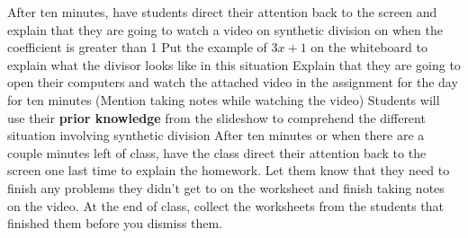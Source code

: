 \begin{outline}
    \1 After ten minutes, have students direct their attention back to the screen and explain that they are going to watch a video on synthetic division on when the coefficient is greater than 1
        \2 Put the example of $3x + 1$ on the whiteboard to explain what the divisor looks like in this situation
    \1 Explain that they are going to open their computers and watch the attached video in the assignment for the day for ten minutes (Mention taking notes while watching the video)
        \2 Students will use their \textbf{prior knowledge} from the slideshow to comprehend the different situation involving synthetic division
    \newpage
    \1 After ten minutes or when there are a couple minutes left of class, have the class direct their attention back to the screen one last time to explain the homework. Let them know that they need to finish any problems they didn't get to on the worksheet and finish taking notes on the video.  
    \1 At the end of class, collect the worksheets from the students that finished them before you dismiss them.
\end{outline}